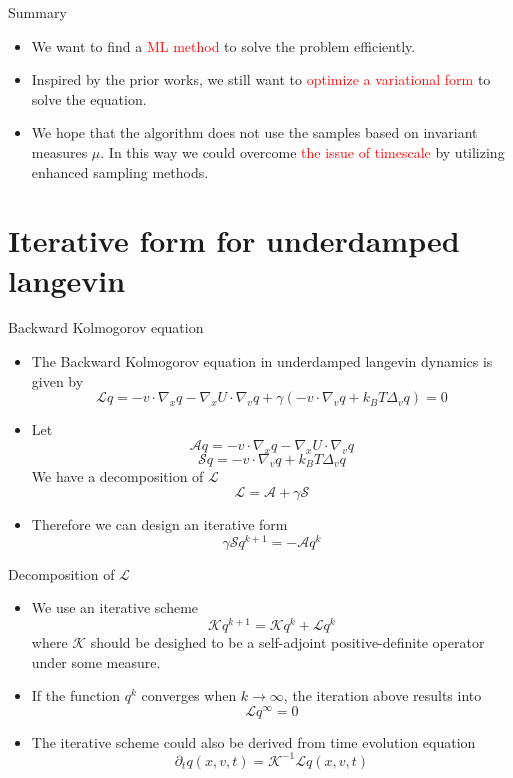 \documentclass{beamer}
\newcommand{\p}{{\partial}}
\newcommand{\kbt}{k_B T}
\newcommand{\LLL}{\mathcal{L}}
\newcommand{\AAA}{\mathcal{A}}
\newcommand{\SSS}{\mathcal{S}}
\newcommand{\KKK}{\mathcal{K}}
\newcommand{\rred}{\textcolor{red}}
\begin{document}
\begin{frame}{Summary}
    \begin{itemize}
        \item We want to find a \rred{ML method} to solve the problem efficiently. 
        \item Inspired by the prior works, we still want to \rred{optimize a variational form} to solve the equation.
        \item We hope that the algorithm does not use the samples based on invariant measures $\mu$. In this way we could overcome \rred{the issue of timescale} by utilizing enhanced sampling methods.
    \end{itemize}
\end{frame}

\section{Iterative form for underdamped langevin}

\begin{frame}{Backward Kolmogorov equation}
\begin{itemize}
    \item The Backward Kolmogorov equation in underdamped langevin dynamics is given by
    $$\mathcal{L}q = -v\cdot \nabla_xq - \nabla_x U\cdot \nabla_v q + \gamma(-v\cdot\nabla_v q + \kbt \Delta_v q) = 0$$
    \item Let 
    $$\AAA q = -v\cdot \nabla_xq - \nabla_x U\cdot \nabla_v q$$
    $$\SSS q = -v\cdot\nabla_v q + \kbt \Delta_v q$$
    We have a decomposition of $\mathcal{L}$
    $$\mathcal{L} = \AAA + \gamma \SSS$$
    \item Therefore we can design an iterative form
    $$ \gamma\SSS q^{k+1} = - \AAA q^{k} $$
    
\end{itemize}
    
\end{frame}

\begin{frame}{Decomposition of $\mathcal{L}$}
\begin{itemize}
    \item We use an iterative scheme
    $$ \KKK q^{k+1} = \KKK q^{k} + \LLL q^{k} $$
    where $\KKK$ should be desighed to be a self-adjoint positive-definite operator under some measure. 
    \item If the function $q^{k}$ converges when $k \to \infty$, the iteration above results into 
    $$ \LLL q^{\infty} = 0$$
    \item The iterative scheme could also be derived from time evolution equation 
    \begin{equation*}
        \p_t q(x,v,t) = \KKK^{-1}\LLL q(x,v,t)
    \end{equation*}
\end{itemize}
\end{frame}
\end{document}
